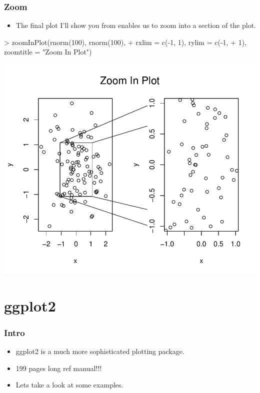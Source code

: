 \begin{frame}
  \frametitle{Zoom}
  \begin{itemize}
  \item The final plot I'll show you from  enables us to zoom into a section of the plot.
  \end{itemize}
\begin{Schunk}
\begin{Sinput}
> zoomInPlot(rnorm(100), rnorm(100), 
+     rxlim = c(-1, 1), rylim = c(-1, 
+         1), zoomtitle = "Zoom In Plot")
\end{Sinput}
\end{Schunk}
\includegraphics{plots/fig-034}
\end{frame}

\section{ggplot2}

\begin{frame}[allowframebreaks]
  \frametitle{Intro}
  \begin{itemize}
  \item \alert{ggplot2} is a much more sophisticated plotting package.
  \item \alert{199} pages long ref manual!!!
  \item Lets take a look at some examples.
  \end{itemize}
\end{frame}

